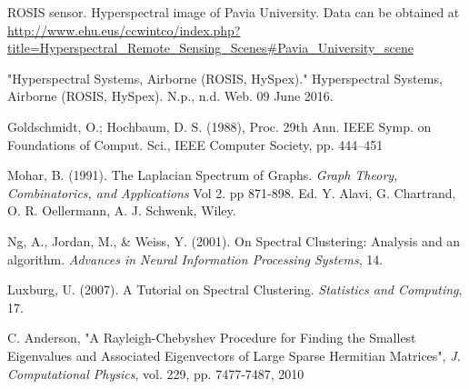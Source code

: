 \documentclass[12pt]{article}
\begin{document}


\begin{thebibliography}{9}
ROSIS sensor. Hyperspectral image of Pavia University. Data can be obtained at \url{http://www.ehu.eus/ccwintco/index.php?title=Hyperspectral_Remote_Sensing_Scenes\#Pavia_University_scene}

"Hyperspectral Systems, Airborne (ROSIS, HySpex)." Hyperspectral Systems, Airborne (ROSIS, HySpex). N.p., n.d. Web. 09 June 2016.

Goldschmidt, O.; Hochbaum, D. S. (1988), Proc. 29th Ann. IEEE Symp. on Foundations of Comput. Sci., IEEE Computer Society, pp. 444–451

Mohar, B. (1991). The Laplacian Spectrum of Graphs. \emph{Graph Theory, Combinatorics, and Applications} Vol 2. pp 871-898. Ed. Y. Alavi, G. Chartrand, O. R. Oellermann, A. J. Schwenk, Wiley.

Ng, A., Jordan, M., \& Weiss, Y. (2001). On Spectral Clustering: Analysis and an
algorithm. \emph{Advances in Neural Information Processing Systems}, 14.

Luxburg, U. (2007). A Tutorial on Spectral Clustering. \emph{Statistics and Computing}, 17.

C. Anderson, "A Rayleigh-Chebyshev Procedure for Finding the Smallest Eigenvalues and Associated Eigenvectors of Large Sparse Hermitian Matrices", \emph{J. Computational Physics}, vol. 229, pp. 7477-7487, 2010
\end{thebibliography}
\end{document}
